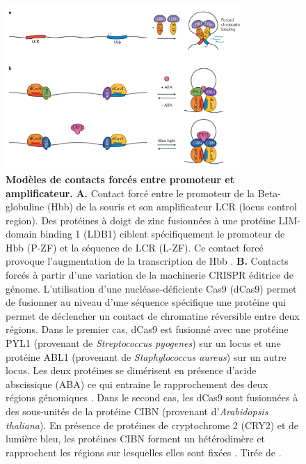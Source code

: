 \begin{figure}[H]
    \centering
    \includegraphics[width=0.8\textwidth, page=1] {figures/introduction/fig12.png}
    \caption[Modèles de contacts forcés entre promoteur et \gls{amplificateur}.]{
    \textbf{Modèles de contacts forcés entre promoteur et \gls{amplificateur}.}
    \textbf{A.} Contact forcé entre le promoteur de la Beta-globuline (Hbb) de la souris et son amplificateur LCR (locus control region). Des protéines à doigt de zinc fusionnées à une protéine LIM-domain binding 1 (LDB1) ciblent spécifiquement le promoteur de Hbb (P-ZF) et la séquence de LCR (L-ZF). Ce contact forcé provoque l'augmentation de la transcription de Hbb \citep{deng_controlling_2012}.
    \textbf{\textbf{B.}} Contacts forcés à partir d'une variation de la machinerie CRISPR éditrice de génome. L'utilisation d'une nucléase-déficiente Cas9 (dCas9) permet de fusionner au niveau d'une séquence spécifique une protéine qui permet de déclencher un contact de chromatine réversible entre deux régions. Dans le premier cas, dCas9 est fusionné avec une protéine PYL1 (provenant de \textit{Streptococcus pyogenes}) sur un locus et une protéine ABL1 (provenant de \textit{Staphylococcus aureus}) sur un autre locus. Les deux protéines se dimérisent en présence d'acide abscissique (ABA) ce qui entraine le rapprochement des deux régions génomiques \citep{morgan_manipulation_2017}. Dans le second cas, les dCas9 sont fusionnées à des sous-unités de la protéine CIBN (provenant d'\textit{Arabidopsis thaliana}). En présence de protéines de cryptochrome 2 (CRY2) et de lumière bleu, les protéines CIBN forment un hétérodimère et rapprochent les régions sur lesquelles elles sont fixées \citep{kim_ladl_2019}. Tirée de \citep{schoenfelder_long-range_2019}.\\
    }
    \label{fig:Fig12}
\end{figure}

